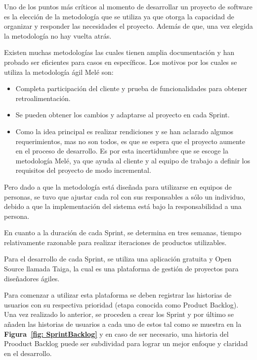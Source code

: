 Uno de los puntos más críticos al momento de desarrollar un proyecto de software es la elección de la metodología que se utiliza ya que otorga la capacidad de organizar y responder las necesidades el proyecto. Además de que, una vez elegida la metodología no hay vuelta atrás.

Existen muchas metodologías las cuales tienen amplia documentación y han probado ser eficientes para casos en específicos. Los motivos por los cuales se utiliza la metodología ágil Melé son:

\begin{itemize}
    \item Completa participación del cliente y prueba de funcionalidades para obtener retroalimentación.

    \item Se pueden obtener los cambios y adaptarse al proyecto en cada Sprint.

    \item Como la idea principal es realizar rendiciones y se han aclarado algunos requerimientos, mas no son todos, es que se espera que el proyecto aumente en el proceso de desarrollo. Es por esta incertidumbre que se escoge la metodología Melé, ya que ayuda al cliente y al equipo de trabajo a definir los requisitos del proyecto de modo incremental.
\end{itemize}

Pero dado a que la metodología está diseñada para utilizarse en equipos de personas, se tuvo que ajustar cada rol con sus responsables a sólo un individuo, debido a que la implementación del sistema está bajo la responsabilidad a una persona.

En cuanto a la duración de cada Sprint, se determina en tres semanas, tiempo relativamente razonable para realizar iteraciones de productos utilizables.

Para el desarrollo de cada Sprint, se utiliza una aplicación gratuita y Open Source llamada Taiga, la cual es una plataforma de gestión de proyectos para diseñadores ágiles.


Para comenzar a utilizar esta plataforma se deben registrar las historias de usuarios con su respectiva prioridad (etapa conocida como Product Backlog). Una vez realizado lo anterior, se proceden a crear los Sprint y por último se añaden las historias de usuarios a cada uno de estos tal como se muestra en la \textbf{Figura~\ref{fig: SprintBacklog}} y en caso de ser necesario, una historia del Prooduct Backlog puede ser subdividad para lograr un mejor enfoque y claridad en el desarrollo.

